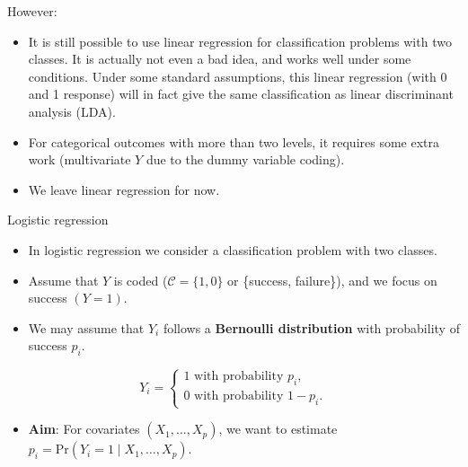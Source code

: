 \documentclass[10pt,ignorenonframetext,]{beamer}
\providecommand{\tightlist}{%
  \setlength{\itemsep}{0pt}\setlength{\parskip}{0pt}}
\begin{document}
\begin{frame}

\begin{block}{However:}

\vspace{2mm}

\begin{itemize}
\tightlist
\item
  It is still possible to use linear regression for classification
  problems with two classes. It is actually not even a bad idea, and
  works well under some conditions. Under some standard assumptions,
  this linear regression (with 0 and 1 response) will in fact give the
  same classification as linear discriminant analysis (LDA).
\end{itemize}

\vspace{2mm}

\begin{itemize}
\tightlist
\item
  For categorical outcomes with more than two levels, it requires some
  extra work (multivariate \(Y\) due to the dummy variable coding).
\end{itemize}

\vspace{2mm}

\begin{itemize}
\tightlist
\item
  We leave linear regression for now.
\end{itemize}

\end{block}

\end{frame}

\begin{frame}{Logistic regression}
\protect\hypertarget{logistic-regression}{}

\begin{itemize}
\item
  In logistic regression we consider a classification problem with two
  classes.
\item
  Assume that \(Y\) is coded (\(\mathcal{C} = \{1, 0\}\) or \{success,
  failure\}), and we focus on success \((Y=1)\).
\item
  We may assume that \(Y_i\) follows a \textbf{Bernoulli distribution}
  with probability of success \(p_i\).
\end{itemize}

\[Y_i = \begin{cases} 1 \text{ with probability } p_i, \\ 0 \text{ with probability } 1-p_i. \end{cases}\]

\begin{itemize}
\tightlist
\item
  \textbf{Aim}: For covariates \((X_1,\ldots,X_p)\), we want to estimate
  \(p_i = \text{Pr}(Y_i=1 \mid X_1,\ldots,X_p)\).
\end{itemize}

\end{frame}
\end{document}
